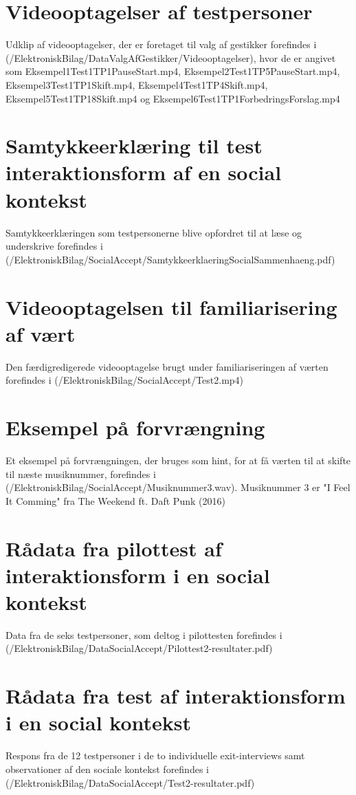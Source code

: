 \section{Videooptagelser af testpersoner}
\label{app:VideooptagelseValgAfGestikkerTestpersoner}
%
Udklip af videooptagelser, der er foretaget til valg af gestikker forefindes i (/ElektroniskBilag/DataValgAfGestikker/Videooptagelser), hvor de er angivet som Eksempel1Test1TP1PauseStart.mp4, Eksempel2Test1TP5PauseStart.mp4, Eksempel3Test1TP1Skift.mp4, Eksempel4Test1TP4Skift.mp4, Eksempel5Test1TP18Skift.mp4 og Eksempel6Test1TP1ForbedringsForslag.mp4
%
\section{Samtykkeerklæring til test interaktionsform af en social kontekst}
\label{app:SamtykkeerklaeringSocialAccept}
%
Samtykkeerklæringen som testpersonerne blive opfordret til at læse og underskrive forefindes i (/ElektroniskBilag/SocialAccept/SamtykkeerklaeringSocialSammenhaeng.pdf)
%
\section{Videooptagelsen til familiarisering af vært}
\label{app:VideooptagelseFam}
%
Den færdigredigerede videooptagelse brugt under familiariseringen af værten forefindes i (/ElektroniskBilag/SocialAccept/Test2.mp4)
%
\section{Eksempel på forvrængning}
\label{app:ForvraengningHint}
%
Et eksempel på forvrængningen, der bruges som hint, for at få værten til at skifte til næste musiknummer, forefindes i (/ElektroniskBilag/SocialAccept/Musiknummer3.wav). Musiknummer 3 er "I Feel It Comming" fra The Weekend ft. Daft Punk (2016)
%
\section{Rådata fra pilottest af interaktionsform i en social kontekst}
\label{app:ResultaterPilottestSocialAccept}
%
Data fra de seks testpersoner, som deltog i pilottesten forefindes i \\
(/ElektroniskBilag/DataSocialAccept/Pilottest2-resultater.pdf)
%
\section{Rådata fra test af interaktionsform i en social kontekst}
\label{app:ResultaterSocialAccept}
%
Respons fra de 12 testpersoner i de to individuelle exit-interviews samt observationer af den sociale kontekst forefindes i (/ElektroniskBilag/DataSocialAccept/Test2-resultater.pdf)
%
